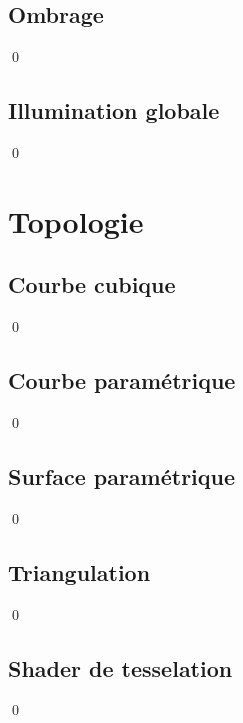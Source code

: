 \documentclass[12pt]{article}
\newcommand{\state}{\noindent}
\begin{document}
\subsection{Ombrage}

\state

\qed

\subsection{Illumination globale}

\state

\qed

\pagebreak

\section{Topologie}

\subsection{Courbe cubique}

\state

\qed

\subsection{Courbe paramétrique}

\state

\qed

\subsection{Surface paramétrique}

\state

\qed

\subsection{Triangulation}

\state

\qed

\subsection{Shader de tesselation}

\state

\qed


\pagebreak
\end{document}

